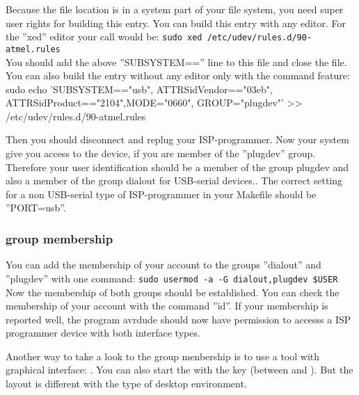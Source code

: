 Because the file location is in a system part of your file system, you need super user rights
for building this entry. You can build this entry with any editor.
For the ''xed'' editor your call would be:
\verb"sudo xed /etc/udev/rules.d/90-atmel.rules"\\
You should add the above ''SUBSYSTEM=='' line to this file and close the file.
You can also build the entry without any editor only with the command feature:
{sudo echo 'SUBSYSTEM=="usb", ATTRS{idVendor}=="03eb", ATTRS{idProduct}=="2104",MODE="0660", GROUP="plugdev"' >> /etc/udev/rules.d/90-atmel.rules}

Then you should disconnect and replug your ISP-programmer.
Now your system give you access to the device, if you are member of the ''plugdev'' group.
Therefore your user identification should be a member of the group plugdev and also
a member of the group dialout for USB-serial devices..
The correct setting for a non USB-serial type of ISP-programmer
in your Makefile should be ''PORT=usb''.\\

\subsubsection{group membership}
 
You can add the membership of your account to the groups ''dialout'' and ''plugdev'' with one command:
\large{\newline\verb"sudo usermod -a -G dialout,plugdev $USER"\newline}
Now the membership of both groups should be established.
You can check the membership of your account with the command ''id''.
If your membership is reported well, the program avrdude should now have permission to accesss
a ISP programmer device with both interface types.

Another way to take a look to the group menbership is to use a tool with
graphical  interface:
.
You can also start the  with the \keys{\winmenu} key (between  and
\keys{\Alt}).
But the layout is different with the type of desktop environment.

